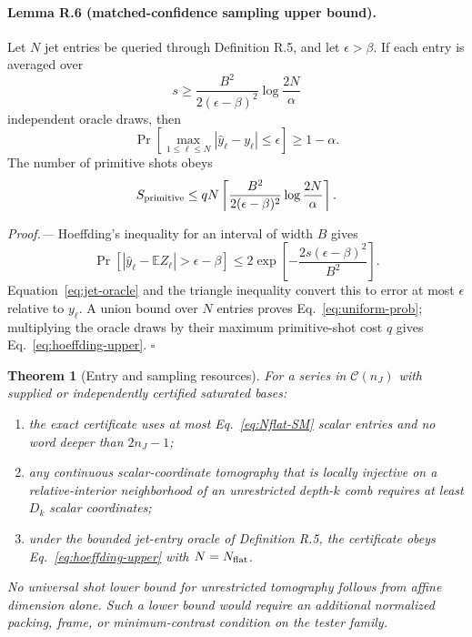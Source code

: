 \documentclass[aps,prl,onecolumn,superscriptaddress,nofootinbib]{revtex4-2}
\newcommand{\cC}{\mathcal C}
\newtheorem{theorem}{Theorem}
\begin{document}
\paragraph{Lemma R.6 (matched-confidence sampling upper bound).}
Let $N$ jet entries be queried through Definition R.5, and let $\epsilon>\beta$.  If each entry is averaged over
\begin{equation}
 s\ge
 \frac{B^2}{2(\epsilon-\beta)^2}
 \log\frac{2N}{\alpha}
 \label{eq:oracle-repetitions}
\end{equation}
independent oracle draws, then
\begin{equation}
 \Pr\!\left[
 \max_{1\le\ell\le N}|\widehat y_\ell-y_\ell|\le\epsilon
 \right]\ge1-\alpha.
 \label{eq:uniform-prob}
\end{equation}
The number of primitive shots obeys
\begin{equation}
 S_{\rm primitive}\le
 qN\left\lceil
 \frac{B^2}{2(\epsilon-\beta)^2}
 \log\frac{2N}{\alpha}
 \right\rceil.
 \label{eq:hoeffding-upper}
\end{equation}

\emph{Proof.---}
Hoeffding's inequality for an interval of width $B$ gives
\begin{equation}
 \Pr\!\left[
 |\widehat y_\ell-\mathbb EZ_\ell|>\epsilon-\beta
 \right]
 \le2\exp\!\left[-\frac{2s(\epsilon-\beta)^2}{B^2}\right].
\end{equation}
Equation~\eqref{eq:jet-oracle} and the triangle inequality convert this to error at most $\epsilon$ relative to $y_\ell$.  A union bound over $N$ entries proves Eq.~\eqref{eq:uniform-prob}; multiplying the oracle draws by their maximum primitive-shot cost $q$ gives Eq.~\eqref{eq:hoeffding-upper}. \hfill$\square$

\begin{theorem}[Entry and sampling resources]
\label{thm:R}
For a series in $\cC(n_J)$ with supplied or independently certified saturated bases:
\begin{enumerate}
\item the exact certificate uses at most Eq.~\eqref{eq:Nflat-SM} scalar entries and no word deeper than $2n_J-1$;
\item any continuous scalar-coordinate tomography that is locally injective on a relative-interior neighborhood of an unrestricted depth-$k$ comb requires at least $D_k$ scalar coordinates;
\item under the bounded jet-entry oracle of Definition R.5, the certificate obeys Eq.~\eqref{eq:hoeffding-upper} with $N=N_{\rm flat}$.
\end{enumerate}
No universal shot lower bound for unrestricted tomography follows from affine dimension alone.  Such a lower bound would require an additional normalized packing, frame, or minimum-contrast condition on the tester family.
\end{theorem}
\end{document}
